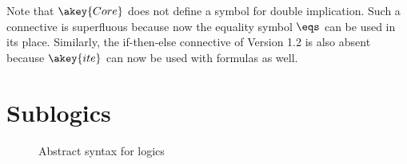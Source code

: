 Note that $\akey{Core}$ does not define a symbol for double implication.
Such a connective is superfluous because now the equality symbol $\eqs$ 
can be used in its place. 
Similarly, 
the if-then-else connective of Version 1.2 is also absent
because $\akey{ite}$ can now be used with formulas as well.




\section{Sublogics} \label{sec:sublogics}  %

\begin{figure}
\logics
\caption{Abstract syntax for logics}
\label{fig:abstract-logics}
\end{figure}





%

